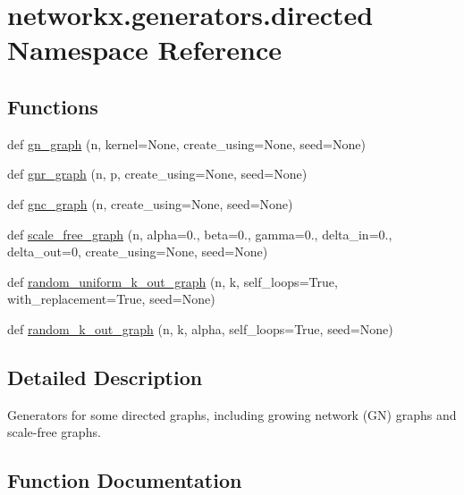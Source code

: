 \hypertarget{namespacenetworkx_1_1generators_1_1directed}{}\section{networkx.\+generators.\+directed Namespace Reference}
\label{namespacenetworkx_1_1generators_1_1directed}
\subsection*{Functions}
\begin{DoxyCompactItemize}
\item 
def \hyperlink{namespacenetworkx_1_1generators_1_1directed_ad56ecf0dff3a29c11849cdec1764b2f2}{gn\+\_\+graph} (n, kernel=None, create\+\_\+using=None, seed=None)
\item 
def \hyperlink{namespacenetworkx_1_1generators_1_1directed_a2897bcbb81bdf767e93c29a4080b36b7}{gnr\+\_\+graph} (n, p, create\+\_\+using=None, seed=None)
\item 
def \hyperlink{namespacenetworkx_1_1generators_1_1directed_a215b5547a0c19ece134e9a00b1ff7932}{gnc\+\_\+graph} (n, create\+\_\+using=None, seed=None)
\item 
def \hyperlink{namespacenetworkx_1_1generators_1_1directed_aec6f28e2d6c0aa0a6ac5cfa0f339b231}{scale\+\_\+free\+\_\+graph} (n, alpha=0., beta=0., gamma=0., delta\+\_\+in=0., delta\+\_\+out=0, create\+\_\+using=None, seed=None)
\item 
def \hyperlink{namespacenetworkx_1_1generators_1_1directed_a8bf4b279d4cc1f9839eb28fac2608429}{random\+\_\+uniform\+\_\+k\+\_\+out\+\_\+graph} (n, k, self\+\_\+loops=True, with\+\_\+replacement=True, seed=None)
\item 
def \hyperlink{namespacenetworkx_1_1generators_1_1directed_a2b7a269e4dde527be1d0c6a8ba3b0c19}{random\+\_\+k\+\_\+out\+\_\+graph} (n, k, alpha, self\+\_\+loops=True, seed=None)
\end{DoxyCompactItemize}


\subsection{Detailed Description}
\begin{DoxyVerb}Generators for some directed graphs, including growing network (GN) graphs and
scale-free graphs.\end{DoxyVerb}
 

\subsection{Function Documentation}
\mbox{\label{namespacenetworkx_1_1generators_1_1directed_ad56ecf0dff3a29c11849cdec1764b2f2}} 
